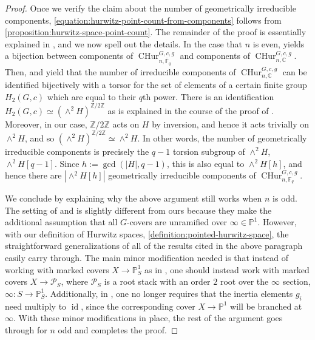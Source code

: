 \documentclass[12 pt]{amsart}
\theoremstyle{plain}
\theoremstyle{definition}
\theoremstyle{remark}
\numberwithin{equation}{section}
\DeclareMathOperator\id{id}
\newcommand{\boundarycphur}[5]{\operatorname{CHur}^{#1, #3, #5}_{#2, #4}}
\begin{document}
\begin{proof}
Once we verify the claim about the number of geometrically irreducible
components,
\eqref{equation:hurwitz-point-count-from-components}
follows from
\autoref{proposition:hurwitz-space-point-count}.
The remainder of the proof is essentially explained in 
\cite[Theorem
3.1]{sawinW:conjectures-for-distributions-containing-roots-of-unity},
and we now spell out the details.
In the case that $n$ is even, 
\cite[Lemma 10.3]{liuWZB:a-predicted-distribution} yields a
bijection between components of
$\boundarycphur G n c {\overline{\mathbb F}_q} g$ and components of
$\boundarycphur G n c {\mathbb C} g$.
Then, \cite[Theorem 12.1(2)]{liuWZB:a-predicted-distribution} and
\cite[Corollary 12.6]{liuWZB:a-predicted-distribution} yield that the
number of irreducible components of
$\boundarycphur G n c {\mathbb C} g$ can be identified bijectively with a torsor
for the set of elements of a certain finite group $H_2(G, c)$
which are equal to their $q$th power.
There is an identification $H_2(G, c) \simeq (\wedge^2 H)^{\mathbb Z/2 \mathbb
Z}$
as is explained in 
the course of the proof of 
\cite[Theorem
3.1]{sawinW:conjectures-for-distributions-containing-roots-of-unity}.
Moreover, in our case, $\mathbb Z/2 \mathbb Z$ acts on $H$ by inversion, and
hence it acts trivially on $\wedge^2 H$, and so 
$(\wedge^2 H)^{\mathbb Z/2 \mathbb Z} \simeq \wedge^2 H$.
In other words, the number of geometrically
irreducible components is precisely
the $q-1$ torsion subgroup of $\wedge^2 H$,
$\wedge^2 H[q-1]$. Since $h := \gcd(|H| , q-1)$, this is also equal to $\wedge^2
H[h]$, and hence there are $\left|\wedge^2 H[h]\right|$ geometrically irreducible components
of $\boundarycphur G n c {{\mathbb F}_q} g$.

We conclude by explaining why the above argument still works when $n$ is odd.
The setting of 
\cite{sawinW:conjectures-for-distributions-containing-roots-of-unity}
and
\cite{liuWZB:a-predicted-distribution} is
slightly different from ours because they make the additional assumption
that all $G$-covers are unramified over $\infty \in \mathbb P^1$.
However, with our definition of Hurwitz spaces,
\autoref{definition:pointed-hurwitz-space},
the straightforward generalizations of 
all of the results cited in the above paragraph easily carry through.
The main minor modification needed is that instead of working with marked
covers $X \to \mathbb P^1_S$ as in
\cite{wood:an-algebraic-lifting-invariant}, one should instead work
with marked covers $X \to \mathscr P_S$, where $\mathscr P_S$ is a
root stack with an order $2$ root over the $\infty$ section, $\infty: S \to
\mathbb P^1_S$.
Additionally, in \cite[Theorem 12.4]{liuWZB:a-predicted-distribution},
one no longer requires that the inertia elements $g_i$ need multiply to
$\id$, since the corresponding cover $X \to \mathbb P^1$ will be
branched at $\infty$.
With these minor modifications in place, the rest of the argument goes
through for $n$ odd and completes the proof.


\end{proof}
\end{document}
